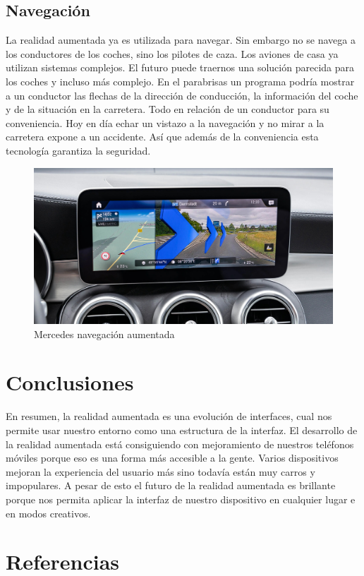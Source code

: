 \documentclass[a4paper,11pt]{scrartcl}
\begin{document}
\subsection{Navegación}
La realidad aumentada ya es utilizada para navegar. Sin embargo no se navega a los conductores de los coches, sino los pilotes de caza. Los aviones de casa ya utilizan sistemas complejos. El futuro puede traernos una solución parecida para los coches y incluso más complejo. En el parabrisas un programa podría mostrar a un conductor las flechas de la dirección de conducción, la información del coche y de la situación en la carretera. Todo en relación de un conductor para su conveniencia. Hoy en día echar un vistazo a la navegación y no mirar a la carretera expone a un accidente. Así que además de la conveniencia esta tecnología garantiza la seguridad.

\begin{figure}[h]
    \centering
    \includegraphics[width=0.7\linewidth]{mercedesnavigation}
    \caption{Mercedes navegación aumentada \cite{imgmercedesnavigation}}
\end{figure}
 
 
\section{Conclusiones}
En resumen, la realidad aumentada es una evolución de interfaces, cual nos permite usar nuestro entorno como una estructura de la interfaz. El desarrollo de la realidad aumentada está consiguiendo con mejoramiento de nuestros teléfonos móviles porque eso es una forma más accesible a la gente. Varios dispositivos mejoran la experiencia del usuario más sino todavía están muy carros y impopulares. A pesar de esto el futuro de la realidad aumentada es brillante porque nos permita aplicar la interfaz de nuestro dispositivo en cualquier lugar e en modos creativos.

\section{Referencias}
\printbibliography
\end{document}
